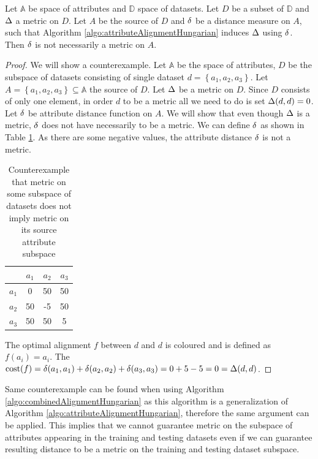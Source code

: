 \begin{observation}
	\label{theorem:metricNonRestorationSupportedSpaces}
	Let $\mathbb{A}$ be space of attributes and $\mathbb{D}$ space of datasets. Let $D$ be a subset of $\mathbb{D}$ and $\Delta$ a metric on $D$. Let $A$ be the source of $D$ and $\delta$ be a distance measure on $A$, such that Algorithm \ref{algo:attributeAlignmentHungarian} induces $\Delta$ using $\delta$. Then $\delta$ is not necessarily a metric on $A$.
	\begin{proof}
	We will show a counterexample.
	Let $\mathbb{A}$ be the space of attributes, $D$ be the subspace of datasets  consisting of single dataset $d=\left\lbrace a_1, a_2, a_3 \right\rbrace$. Let $A=\left\lbrace a_1, a_2, a_3 \right\rbrace \subseteq \mathbb{A}$ the source of $D$. Let $\Delta$ be a metric on  $D$. Since $D$ consists of only one element, in order $d$ to be a metric all we need to do is set $\Delta(d,d)=0$. Let $\delta$ be attribute distance function on $A$. We will show that even though $\Delta$ is a metric, $\delta$ does not have necessarily to be a metric. We can define $\delta$ as shown in Table \ref{table:supportAttributeCounterexample}. As there are some negative values, the attribute distance $\delta$ is not a metric.
	\begin{table}
		\caption{Counterexample that metric on some subspace of datasets does not imply metric on its source attribute subspace}
		\label{table:supportAttributeCounterexample}
		\centering
		\begin{tabular}{ |c | c | c |c | }
			\hline
			& $a_1$ & $a_2$ & $a_3$  \\
			\hline                       
			$a_1$ & \cellcolor{blue!25} 0 & 50 & 50  \\
			$a_2$ & 50 &\cellcolor{blue!25}-5 & 50  \\
			$a_3$ & 50  & 50 & \cellcolor{blue!25}5  \\
			\hline  
		\end{tabular}
	\end{table}
	The optimal alignment $f$ between $d$ and $d$ is coloured and is defined as $f(a_i)=a_i$.
	The $\text{cost}(f)=\delta(a_1,a_1)+\delta(a_2,a_2)+\delta(a_3,a_3)=0+5-5=0=\Delta(d,d)$.
	\end{proof}
\end{observation}

Same counterexample can be found when using Algorithm \ref{algo:combinedAlignmentHungarian} as this algorithm is a generalization of Algorithm \ref{algo:attributeAlignmentHungarian}, therefore the same argument can be applied. 
This implies that we cannot guarantee metric on the subspace of attributes appearing in the training and testing datasets even if we can guarantee resulting distance to be a metric on the training and testing dataset subspace.

